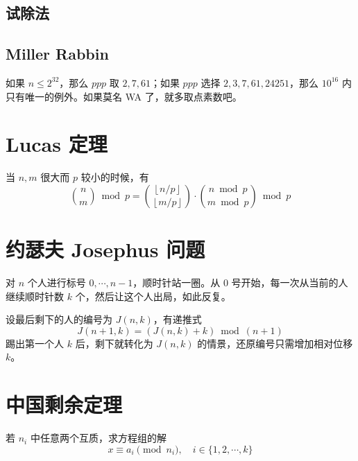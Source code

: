 \documentclass{probook}
\begin{document}
\begin{multicols}{2}
\subsection{试除法}



\subsection{Miller Rabbin}

如果 $n\leqslant 2^{32}$，那么 $ppp$ 取 $2,7,61$；如果 $ppp$ 选择 $2,3,7,61,24251$，那么 $10^{16}$ 内只有唯一的例外。如果莫名 WA 了，就多取点素数吧。



\section{Lucas 定理}

当 $n,m$ 很大而 $p$ 较小的时候，有
\[  
\binom{n}{m}\bmod p = \binom{\left\lfloor n/p \right\rfloor}{\left\lfloor m/p\right\rfloor}\cdot\binom{n\bmod p}{m\bmod p}\bmod p 
\]



\section{约瑟夫 Josephus 问题}

对 $n$ 个人进行标号 $0,\cdots,n-1$，顺时针站一圈。从 $0$ 号开始，每一次从当前的人继续顺时针数 $k$ 个，然后让这个人出局，如此反复。

设最后剩下的人的编号为 $J(n,k)$，有递推式
\[J(n+1,k) = (J(n,k)+k) \bmod (n+1)\]
踢出第一个人 $k$ 后，剩下就转化为 $J(n,k)$ 的情景，还原编号只需增加相对位移 $k$。



\section{中国剩余定理}

若 $n_i$ 中任意两个互质，求方程组的解
\[ x \equiv a_i \pmod {n_i} , \quad i \in \{ 1,2,\cdots,k \} \]




\end{multicols}
\end{document}
